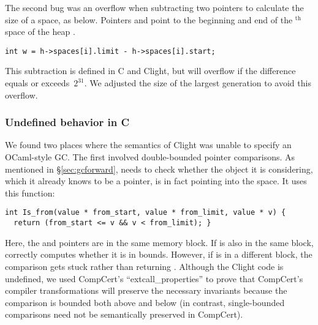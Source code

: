 The second bug was an overflow when subtracting two pointers
to calculate the size of a space, as below. Pointers  and 
point to the beginning and end of the $^{\text{th}}$ space of the
heap .
\begin{lstlisting}[numbers=none]
  int w = h->spaces[i].limit - h->spaces[i].start;
\end{lstlisting}
This subtraction is defined in C and Clight, but
will overflow if the difference equals
or exceeds~$2^{31}$. We adjusted the size of the largest generation to avoid this overflow.

\subsubsection*{Undefined behavior in C} %
We found two places where the semantics of Clight was unable to specify an OCaml-style GC.
The first involved double-bounded pointer comparisons.
As mentioned in \S\ref{sec:gcforward},  needs to
check whether the object it is considering, which it already knows to be a pointer,
is in fact pointing into the  space. It uses this function:
\begin{lstlisting}[numbers=none]
int Is_from(value * from_start, value * from_limit, value * v) {
  return (from_start <= v && v < from_limit); }
\end{lstlisting}
Here, the  and  pointers are in the same
memory block. If  is also in the same block, 
correctly computes whether it is in bounds.
However, if  is in a different block, the comparison gets stuck rather than 
returning .
Although the Clight code is undefined, we used CompCert's ``extcall{\_}properties''
to prove that CompCert's compiler transformations will preserve the necessary invariants
because the comparison is bounded both above and below (in contrast, single-bounded 
comparisons need not be semantically preserved in CompCert).

